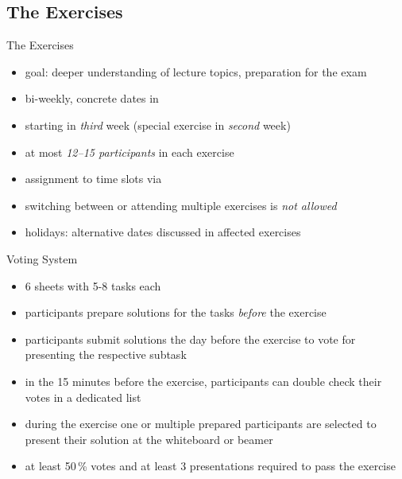 \subsection{The Exercises}
\begin{frame}{\insertsubsection}
	\small
	\begin{fancycolumns}[widths={30}]
		\begin{definition}{The Exercises}
			\begin{itemize}
				\item goal: deeper understanding of lecture topics, preparation for the exam
				\item bi-weekly, concrete dates in \StudIPExercise
				\item starting in \emph{third} week (special exercise in \emph{second} week)
				\item at most \emph{12--15 participants} in each exercise
				\item assignment to time slots via \StudIPExercise
				\item switching between or attending multiple exercises is \emph{not allowed}
				\item holidays: alternative dates discussed in affected exercises
			\end{itemize}
		\end{definition}
		\nextcolumn
		\begin{definition}{Voting System }
			\begin{itemize}
				\item 6 sheets with 5-8 tasks each
				\item participants prepare solutions for the tasks \emph{before} the exercise
				\item participants submit solutions the day before the exercise to vote  for presenting the respective subtask
				\item in the 15 minutes before the exercise, participants can double check their votes  in a dedicated list 
				\item during the exercise one or multiple prepared participants are selected to present their solution at the whiteboard or beamer
				\item at least 50\,\% votes  and at least 3 presentations  required to pass the exercise 

\end{itemize}
\end{definition}
\end{fancycolumns}
\end{frame}
